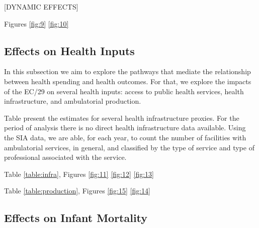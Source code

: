 [DYNAMIC EFFECTS]

Figures \ref{fig:9} \ref{fig:10}
















\subsection{Effects on Health Inputs}

In this subsection we aim to explore the pathways that mediate the relationship between health spending and health outcomes. For that, we explore the impacts of the EC/29 on several health inputs: access to public health services, health infrastructure, and ambulatorial production.

Table present the estimates for several health infrastructure proxies. For the period of analysis there is no direct health infrastructure data available. Using the SIA data, we are able, for each year, to count the number of facilities with ambulatorial services, in general, and classified by the type of service and type of professional associated with the service. 

Table \ref{table:infra}, Figures \ref{fig:11} \ref{fig:12} \ref{fig:13}









Table \ref{table:production}, Figures \ref{fig:15} \ref{fig:14}









\subsection{Effects on Infant Mortality}

